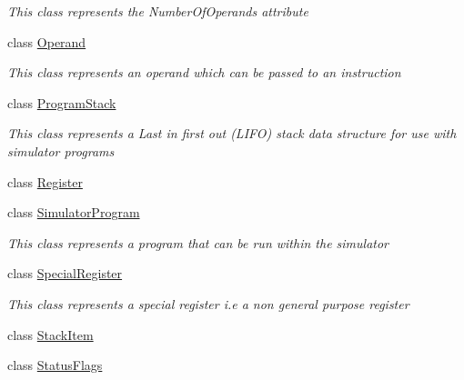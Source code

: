 \begin{DoxyCompactItemize}
\begin{DoxyCompactList}\small\item\em This class represents the Number\+Of\+Operands attribute \end{DoxyCompactList}\item 
class \hyperlink{class_c_p_u___o_s___simulator_1_1_c_p_u_1_1_operand}{Operand}
\begin{DoxyCompactList}\small\item\em This class represents an operand which can be passed to an instruction \end{DoxyCompactList}\item 
class \hyperlink{class_c_p_u___o_s___simulator_1_1_c_p_u_1_1_program_stack}{Program\+Stack}
\begin{DoxyCompactList}\small\item\em This class represents a Last in first out (L\+I\+F\+O) stack data structure for use with simulator programs \end{DoxyCompactList}\item 
class \hyperlink{class_c_p_u___o_s___simulator_1_1_c_p_u_1_1_register}{Register}
\item 
class \hyperlink{class_c_p_u___o_s___simulator_1_1_c_p_u_1_1_simulator_program}{Simulator\+Program}
\begin{DoxyCompactList}\small\item\em This class represents a program that can be run within the simulator \end{DoxyCompactList}\item 
class \hyperlink{class_c_p_u___o_s___simulator_1_1_c_p_u_1_1_special_register}{Special\+Register}
\begin{DoxyCompactList}\small\item\em This class represents a special register i.\+e a non general purpose register \end{DoxyCompactList}\item 
class \hyperlink{class_c_p_u___o_s___simulator_1_1_c_p_u_1_1_stack_item}{Stack\+Item}
\item 
class \hyperlink{class_c_p_u___o_s___simulator_1_1_c_p_u_1_1_status_flags}{Status\+Flags}
\end{DoxyCompactItemize}
